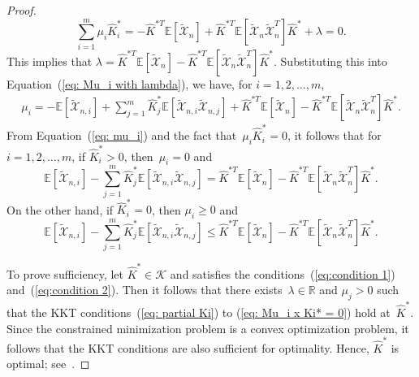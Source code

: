\documentclass[10pt]{article} %
\begin{document}
\begin{proof}
\begin{equation}
			\sum_{i=1}^m \mu_i \widehat{K}_i^* = -\widehat{K}^{*T} \mathbb{E}\left[ \widetilde{\mathcal{X}}_{n} \right] + \widehat{K}^{*T} \mathbb{E}\left[ \widetilde{\mathcal{X}}_n \widetilde{\mathcal{X}}_n^T \right] \widehat{K}^* + \lambda = 0.
		\end{equation}
		This implies that
		$    \lambda = \widehat{K}^{*T}\mathbb{E}\left[ \widetilde{\mathcal{X}}_n \right] - \widehat{K}^{*T} \mathbb{E}\left[ \widetilde{\mathcal{X}}_n \widetilde{\mathcal{X}}_n^T \right] \widehat{K}^*.
		$
		Substituting this into Equation~(\ref{eq: Mu_i with lambda}), we have, for $i=1,2,\ldots,m$,
		\begin{align} \label{eq: mu_i}
			\mu_i = -\mathbb{E}\left[ \widetilde{\mathcal{X}}_{n,i} \right] + \sum_{j=1}^m \widehat{K}_j^* \mathbb{E}\left[ \widetilde{\mathcal{X}}_{n,i} \widetilde{\mathcal{X}}_{n,j} \right] 
			+ \widehat{K}^{*T} \mathbb{E}\left[ \widetilde{\mathcal{X}}_n \right] - \widehat{K}^{*T} \mathbb{E}\left[ \widetilde{\mathcal{X}}_n \widetilde{\mathcal{X}}_n^T \right] \widehat{K}^*.
		\end{align}
		From Equation~(\ref{eq: mu_i}) and the fact that~$\mu_i \widehat{K}_i^* = 0$, it follows that for
		$i=1,2,\ldots,m$, if $\widehat{K}_i^* > 0$, then~$\mu_i = 0 $ and 
		$$  \mathbb{E}\left[\widetilde{\mathcal{X}}_{n,i}\right] -\sum_{j=1}^m \widehat{K}_j^* \mathbb{E}\left[\widetilde{\mathcal{X}}_{n,i} \widetilde{\mathcal{X}}_{n,j} \right] \nonumber 
		= \widehat{K}^{*T} \mathbb{E}\left[ \widetilde{\mathcal{X}}_{n} \right]
		- \widehat{K}^{*T} \mathbb{E}\left[ \widetilde{\mathcal{X}}_n \widetilde{\mathcal{X}}_n^T \right] \widehat{K}^*.
		$$
		On the other hand,
		if $\widehat{K}_i^* = 0$, then $\mu_i \geq 0$ and
		$$    \mathbb{E}\left[\widetilde{\mathcal{X}}_{n,i}\right] -\sum_{j=1}^m \widehat{K}_j^* \mathbb{E}\left[\widetilde{\mathcal{X}}_{n,i} \widetilde{\mathcal{X}}_{n,j} \right] \nonumber 
		\leq \widehat{K}^{*T} \mathbb{E}\left[ \widetilde{\mathcal{X}}_{n} \right]
		- \widehat{K}^{*T} \mathbb{E}\left[ \widetilde{\mathcal{X}}_n \widetilde{\mathcal{X}}_n^T \right] \widehat{K}^*.
		$$
		
		To prove sufficiency, let $\widehat{K}^* \in \mathcal{K}$ and satisfies the conditions~(\ref{eq:condition 1}) and~(\ref{eq:condition 2}). 
		Then it follows that there exists~$\lambda \in \mathbb{R}$ and $\mu_j > 0$ such that the KKT conditions~(\ref{eq: partial Ki}) to (\ref{eq: Mu_i x Ki* = 0}) hold at~$\widehat{K}^*$. 
		Since the constrained minimization problem is a convex optimization problem, it follows that the KKT conditions are also sufficient for optimality. Hence, $\widehat{K}^*$ is optimal; see~\cite{ boyd2017multi}. 
	\end{proof}
	
\end{document}
